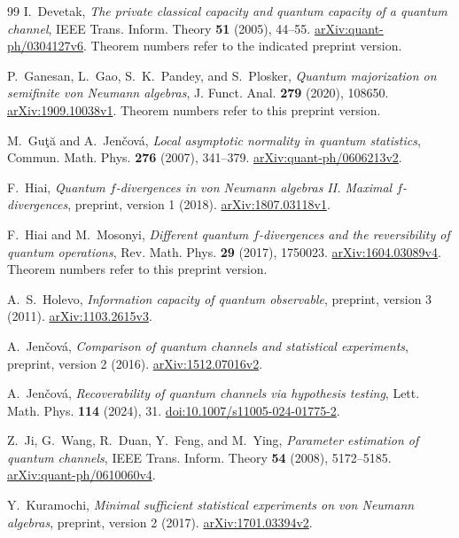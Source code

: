 \documentclass[11pt,reqno]{amsart}
\theoremstyle{definition}
\theoremstyle{remark}
\numberwithin{equation}{section}
\begin{document}
\begin{thebibliography}{99}
I.~Devetak,
\emph{The private classical capacity and quantum capacity of a quantum channel},
IEEE Trans. Inform. Theory \textbf{51} (2005), 44--55.
\href{https://arxiv.org/abs/quant-ph/0304127v6}{arXiv:quant-ph/0304127v6}.
Theorem numbers refer to the indicated preprint version.

P.~Ganesan, L.~Gao, S.~K.~Pandey, and S.~Plosker,
\emph{Quantum majorization on semifinite von Neumann algebras},
J. Funct. Anal. \textbf{279} (2020), 108650.
\href{https://arxiv.org/abs/1909.10038v1}{arXiv:1909.10038v1}.
Theorem numbers refer to this preprint version.

M.~Gu\c t\u a and A.~Jen\v cov\'a,
\emph{Local asymptotic normality in quantum statistics},
Commun. Math. Phys. \textbf{276} (2007), 341--379.
\href{https://arxiv.org/abs/quant-ph/0606213v2}{arXiv:quant-ph/0606213v2}.

F.~Hiai,
\emph{Quantum $f$-divergences in von Neumann algebras II. Maximal $f$-divergences},
preprint, version 1 (2018).
\href{https://arxiv.org/abs/1807.03118v1}{arXiv:1807.03118v1}.

F.~Hiai and M.~Mosonyi,
\emph{Different quantum $f$-divergences and the reversibility of quantum operations},
Rev. Math. Phys. \textbf{29} (2017), 1750023.
\href{https://arxiv.org/abs/1604.03089v4}{arXiv:1604.03089v4}.
Theorem numbers refer to this preprint version.

A.~S.~Holevo,
\emph{Information capacity of quantum observable},
preprint, version 3 (2011).
\href{https://arxiv.org/abs/1103.2615v3}{arXiv:1103.2615v3}.

A.~Jen\v cov\'a,
\emph{Comparison of quantum channels and statistical experiments},
preprint, version 2 (2016).
\href{https://arxiv.org/abs/1512.07016v2}{arXiv:1512.07016v2}.

A.~Jen\v cov\'a,
\emph{Recoverability of quantum channels via hypothesis testing},
Lett. Math. Phys. \textbf{114} (2024), 31.
\href{https://doi.org/10.1007/s11005-024-01775-2}{doi:10.1007/s11005-024-01775-2}.

Z.~Ji, G.~Wang, R.~Duan, Y.~Feng, and M.~Ying,
\emph{Parameter estimation of quantum channels},
IEEE Trans. Inform. Theory \textbf{54} (2008), 5172--5185.
\href{https://arxiv.org/abs/quant-ph/0610060v4}{arXiv:quant-ph/0610060v4}.

Y.~Kuramochi,
\emph{Minimal sufficient statistical experiments on von Neumann algebras},
preprint, version 2 (2017).
\href{https://arxiv.org/abs/1701.03394v2}{arXiv:1701.03394v2}.


\end{thebibliography}
\end{document}
